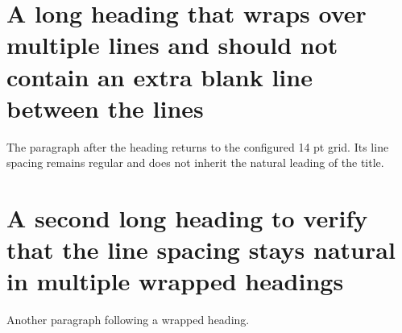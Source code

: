 \documentclass[10pt]{article}
\begin{document}
\section{A long heading that wraps over multiple lines and should not contain an extra blank line between the lines}
The paragraph after the heading returns to the configured 14 pt grid. Its line
spacing remains regular and does not inherit the natural leading of the title.

\section{A second long heading to verify that the line spacing stays natural in multiple wrapped headings}
Another paragraph following a wrapped heading.
\end{document}

